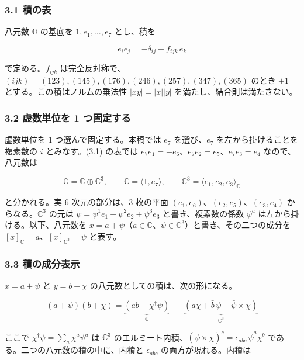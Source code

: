 \documentclass[
  a4paper,
]{ltjsarticle}
\begin{document}
\subsubsection{3.1 積の表}\label{ux7a4dux306eux8868}

八元数 \(\mathbb{O}\) の基底を \(1, e_1, \dots, e_7\) とし、積を

\[
e_i e_j = -\delta_{ij} + f_{ijk}\,e_k \tag{3.1}
\]

で定める。\(f_{ijk}\)
は完全反対称で、\((ijk) = (123), (145), (176), (246), (257), (347), (365)\)
のとき \(+1\) とする。この積はノルムの乗法性 \(|xy| = |x||y|\)
を満たし、結合則は満たさない。

\subsubsection{3.2 虚数単位を 1
つ固定する}\label{ux865aux6570ux5358ux4f4dux3092-1-ux3064ux56faux5b9aux3059ux308b}

虚数単位を 1 つ選んで固定する。本稿では \(e_7\) を選び、\(e_7\)
を左から掛けることを複素数の \(i\) とみなす。(3.1) の表では
\(e_7e_1 = -e_6\)、\(e_7e_2 = e_5\)、\(e_7e_3 = e_4\) なので、八元数は

\[
\mathbb{O} = \mathbb{C} \oplus \mathbb{C}^3,\qquad
\mathbb{C} = \langle 1, e_7\rangle,\qquad
\mathbb{C}^3 = \langle e_1, e_2, e_3\rangle_{\mathbb C} \tag{3.2}
\]

と分かれる。実 6 次元の部分は、3 枚の平面
\((e_1, e_6)\)、\((e_2, e_5)\)、\((e_3, e_4)\)
からなる。\(\mathbb{C}^3\) の元は
\(\psi = \psi^1e_1 + \psi^2e_2 + \psi^3e_3\) と書き、複素数の係数
\(\psi^a\) は左から掛ける。以下、八元数を
\(x = a + \psi\)（\(a \in \mathbb{C}\)、\(\psi \in \mathbb{C}^3\)）と書き、その二つの成分を
\([x]_{\mathbb C} = a\)、\([x]_{\mathbb C^3} = \psi\) と表す。

\subsubsection{3.3
積の成分表示}\label{ux7a4dux306eux6210ux5206ux8868ux793a}

\(x = a + \psi\) と \(y = b + \chi\)
の八元数としての積は、次の形になる。

\[
(a + \psi)(b + \chi) = \underbrace{\left(ab - \chi^\dagger\psi\right)}_{\mathbb{C}}
\;+\; \underbrace{\left(a\chi + \bar b\,\psi + \bar\psi\times\bar\chi\right)}_{\mathbb{C}^3} \tag{3.3}
\]

ここで \(\chi^\dagger\psi = \sum_a \bar\chi^a\psi^a\) は
\(\mathbb{C}^3\)
のエルミート内積、\((\bar\psi\times\bar\chi)^c = \epsilon_{abc}\,\bar\psi^a\bar\chi^b\)
である。二つの八元数の積の中に、内積と \(\epsilon_{abc}\)
の両方が現れる。内積は
\end{document}
